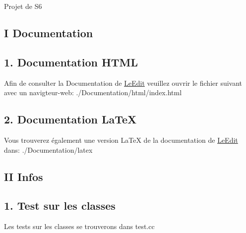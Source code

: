 Projet de S6

\subsection*{I Documentation}





\subsection*{1. Documentation H\-T\-M\-L}

Afin de consulter la Documentation de \hyperlink{class_le_edit}{Le\-Edit} veuillez ouvrir le fichier suivant avec un navigteur-\/web\-: ./\-Documentation/html/index.html

\subsection*{2. Documentation La\-Te\-X}

Vous trouverez également une version La\-Te\-X de la documentation de \hyperlink{class_le_edit}{Le\-Edit} dans\-: ./\-Documentation/latex

\subsection*{I\-I Infos}





\subsection*{1. Test sur les classes}

Les tests sur les classes se trouverons dans test.\-cc 